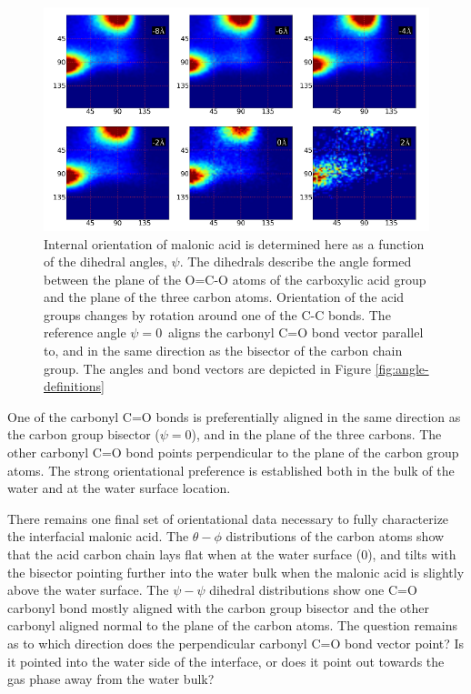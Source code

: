 \begin{figure}[h!]
	\begin{center}
		\includegraphics[scale=1.0]{images/malonic-angles/carboxylic-psi-psi.png}
		\caption{Internal orientation of malonic acid is determined here as a function of the dihedral angles, $\psi$. The dihedrals describe the angle formed between the plane of the O=C-O atoms of the carboxylic acid group  and the plane of the three carbon atoms. Orientation of the acid groups changes by rotation around one of the C-C bonds. The reference angle $\psi=0$\textdegree~aligns the carbonyl C=O bond vector parallel to, and in the same direction as the bisector of the carbon chain group. The angles and bond vectors are depicted in Figure \ref{fig:angle-definitions}}
		\label{fig:carboxylic-psi-psi}
	\end{center}
\end{figure}

One of the carbonyl C=O bonds is preferentially aligned in the same direction as the carbon group bisector ($\psi=0$\textdegree), and in the plane of the three carbons. The other carbonyl C=O bond points perpendicular to the plane of the carbon group atoms. The strong orientational preference is established both in the bulk of the water and at the water surface location.

There remains one final set of orientational data necessary to fully characterize the interfacial malonic acid. The $\theta-\phi$ distributions of the carbon atoms show that the acid carbon chain lays flat when at the water surface (0\angs), and tilts with the bisector pointing further into the water bulk when the malonic acid is slightly above the water surface. The $\psi-\psi$ dihedral distributions show one C=O carbonyl bond mostly aligned with the carbon group bisector and the other carbonyl aligned normal to the plane of the carbon atoms. The question remains as to which direction does the perpendicular carbonyl C=O bond vector point? Is it pointed into the water side of the interface, or does it point out towards the gas phase away from the water bulk?

